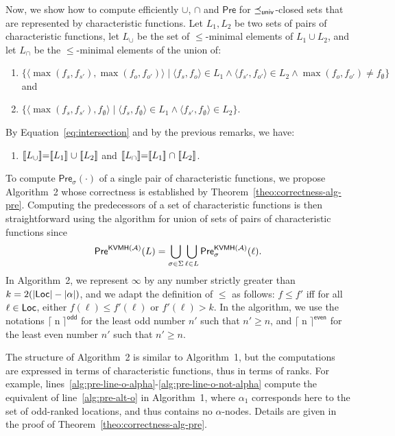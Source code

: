 \documentclass{LMCS}
\def\sg{\mathrel[\joinrel\mathrel[}
\def\sd{\mathrel]\joinrel\mathrel]}
\def\abs#1{\ensuremath{\lvert #1\rvert}}
\newcommand{\Pre}{\mathsf{Pre}}
\newcommand{\sem}[1]{\sg \mathrel{#1} \sd}
\renewcommand{\l}{{\ell}}
\newcommand{\Loc}{{\sf Loc}}
\newcommand{\tuple}[1]{\langle #1 \rangle}
\newcommand{\A}{\mathcal{A}}
\newcommand{\ceilOdd}[1]{\lceil \mathrel {#1} \rceil^{\mathsf{odd}}}
\newcommand{\ceilEven}[1]{\lceil \mathrel {#1} \rceil^{\mathsf{ even}}}
\newcommand{\KVMH}{{\sf KVMH}}
\begin{document}
Now, we show how to compute efficiently $\cup$, $\cap$ and $\Pre$ for
$\preceq_{{\sf univ}}$-closed sets that are represented by
characteristic functions. 
Let $L_1, L_2$ be two sets of pairs of
characteristic functions, let $L_{\cup}$ be the set
of $\leq$-minimal elements of $L_1 \cup L_2$, and let $L_{\cap}$ be the $\leq$-minimal elements
of the union of:
\begin{enumerate}[$\bullet$]
\item[] $\{\tuple{\max(f_s,f_{s'}), \max(f_o,f_{o'})} \mid 
\tuple{f_s,f_o} \in L_1 \land \tuple{f_{s'},f_{o'}} \in L_2 \land \max(f_o,f_{o'}) \not= f_{\emptyset} \}$ and
\item[] $\{\tuple{\max(f_s,f_{s'}), f_{\emptyset}} \mid 
\tuple{f_s,f_{\emptyset}} \in L_1 \land \tuple{f_{s'},f_{\emptyset}} \in L_2 \}$.
\end{enumerate}
By Equation~\eqref{eq:intersection} and by the previous remarks, we have:
\begin{enumerate}[$\bullet$]
\item[] $\sem{L_{\cup}} = \sem{L_1} \cup \sem{L_2}$ and $\sem{L_{\cap}} = \sem{L_1} \cap \sem{L_2}$.
\end{enumerate}\medskip

\noindent To compute $\Pre_{\sigma}(\cdot)$ of a single pair of
characteristic functions, we propose Algorithm~2 whose correctness is
established by Theorem~\ref{theo:correctness-alg-pre}. Computing the
predecessors of a set of characteristic functions is then
straightforward using the algorithm for union of sets of pairs of
characteristic functions since
$$\Pre^{\KVMH(\A)}(L) = \bigcup_{\sigma \in \Sigma} \bigcup_{\l \in L} \Pre^{\KVMH(\A)}_{\sigma}(\l).$$
In Algorithm~2, we represent $\infty$ by any number
strictly greater than $k = 2(\abs{\Loc} - \abs{\alpha})$, and we adapt the definition of $\leq$ as
follows: $f \leq f'$ iff for all $\l \in \Loc$, either $f(\l) \leq
f'(\l)$ or $f'(\l) > k$. In the algorithm, we use the notations
$\ceilOdd{n}$ for the least odd number $n'$ such that $n' \geq n$, and
$\ceilEven{n}$ for the least even number $n'$ such that $n' \geq n$.

The structure of Algorithm~2
is similar to Algorithm~1, but the computations are expressed 
in terms of characteristic functions, thus in terms of ranks. For example,
\mbox{lines~\ref{alg:pre-line-o-alpha}-\ref{alg:pre-line-o-not-alpha}} compute
the equivalent of line~\ref{alg:pre-alt-o} in Algorithm~1,
where $\alpha_1$ corresponds here to the set of odd-ranked locations,
and thus contains no $\alpha$-nodes. Details are given in the proof of 
Theorem~\ref{theo:correctness-alg-pre}.
\end{document}
